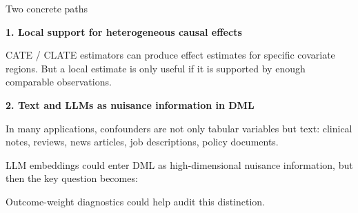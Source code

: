 \documentclass[11pt]{beamer}
\begin{document}
\begin{frame}{Two concrete paths}

\textbf{1. Local support for heterogeneous causal effects}

\vspace{0.1cm}
CATE / CLATE estimators can produce effect estimates for specific covariate regions.  
But a local estimate is only useful if it is supported by enough comparable observations.

\vspace{0.15cm}


\vspace{0.3cm}

\textbf{2. Text and LLMs as nuisance information in DML}

\vspace{0.1cm}
In many applications, confounders are not only tabular variables but text:
clinical notes, reviews, news articles, job descriptions, policy documents.

\vspace{0.15cm}
LLM embeddings could enter DML as high-dimensional nuisance information, but then the key question becomes:

\vspace{0.1cm}


\vspace{0.25cm}
\centering
\alert{Outcome-weight diagnostics could help audit this distinction.}

\end{frame}




\end{document}
